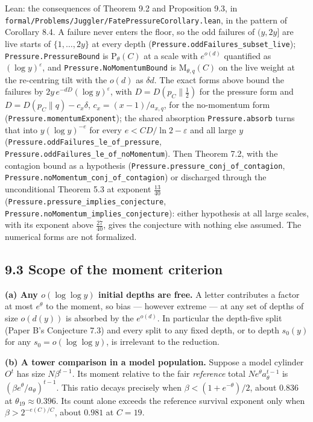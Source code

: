 \documentclass[11pt,a4paper]{article}
\begin{document}
Lean: the consequences of Theorem 9.2 and Proposition 9.3, in
\texttt{\nolinkurl{formal/Problems/Juggler/FatePressureCorollary.lean}},
in the pattern of Corollary 8.4. A failure never enters the floor, so
the odd failures of \((y,2y]\) are live starts of \(\{1,\dots,2y\}\) at
every depth (\texttt{\nolinkurl{Pressure.oddFailures_subset_live}});
\texttt{\nolinkurl{Pressure.PressureBound}} is \(\mathrm P_\theta(C)\)
at a scale with \(e^{o(d)}\) quantified as \((\log y)^\varepsilon\), and
\texttt{\nolinkurl{Pressure.NoMomentumBound}} is
\(\mathrm M_{\theta,q}(C)\) on the live weight at the re-centring tilt
with the \(o(d)\) as \(\delta d\). The exact forms above bound the
failures by \(2y\,e^{-dD}(\log y)^\varepsilon\), with
\(D=D(p_C\|\tfrac12)\) for the pressure form and
\(D=D(p_C\|q)-c_x\delta\), \(c_x=(x-1)/a_{x,q}\), for the no-momentum
form (\texttt{\nolinkurl{Pressure.momentumExponent}}); the shared
absorption \texttt{\nolinkurl{Pressure.absorb}} turns that into
\(y(\log y)^{-e}\) for every \(e<CD/\ln2-\varepsilon\) and all large
\(y\) (\texttt{\nolinkurl{Pressure.oddFailures_le_of_pressure}},
\texttt{\nolinkurl{Pressure.oddFailures_le_of_noMomentum}}). Then
Theorem 7.2, with the contagion bound as a hypothesis
(\texttt{\nolinkurl{Pressure.pressure_conj_of_contagion}},
\texttt{\nolinkurl{Pressure.noMomentum_conj_of_contagion}}) or
discharged through the unconditional Theorem 5.3 at exponent
\(\tfrac{13}{40}\)
(\texttt{\nolinkurl{Pressure.pressure_implies_conjecture}},
\texttt{\nolinkurl{Pressure.noMomentum_implies_conjecture}}): either
hypothesis at all large scales, with its exponent above
\(\tfrac{27}{40}\), gives the conjecture with nothing else assumed. The
numerical forms are not formalized.

\subsection{9.3 Scope of the moment
criterion}\label{scope-of-the-moment-criterion}

\textbf{(a) Any \(o(\log\log y)\) initial depths are free.} A letter
contributes a factor at most \(e^\theta\) to the moment, so bias ---
however extreme --- at any set of depths of size \(o(d(y))\) is absorbed
by the \(e^{o(d)}\). In particular the depth-five split (Paper B's
Conjecture 7.3) and every split to any fixed depth, or to depth
\(s_0(y)\) for any \(s_0=o(\log\log y)\), is irrelevant to the
reduction.

\textbf{(b) A tower comparison in a model population.} Suppose a model
cylinder \(O^t\) has size \(N\beta^{t-1}\). Its moment relative to the
fair \emph{reference} total \(Ne^\theta a_\theta^{t-1}\) is
\((\beta e^\theta/a_\theta)^{t-1}\). This ratio decays precisely when
\(\beta<(1+e^{-\theta})/2\), about \(0.836\) at
\(\theta_{19}\approx0.396\). Its count alone exceeds the reference
survival exponent only when \(\beta>2^{-e(C)/C}\), about \(0.981\) at
\(C=19\).
\end{document}
